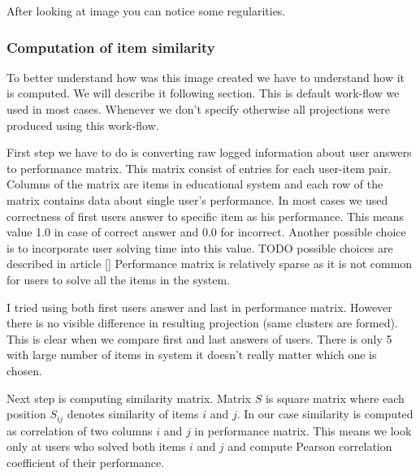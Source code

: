 \documentclass[
  digital, %
  table,   %
  nolof,     %
  nolot,     %
  nocover
]{fithesis3}
\begin{document}


After looking at image you can notice some regularities.

\subsubsection{Computation of item
similarity}\label{computation-of-item-similarity}


To better understand how was this image created we have to understand
how it is computed. We will describe it following section. This is
default work-flow we used in most cases. Whenever we don't specify
otherwise all projections were produced using this work-flow.


First step we have to do is converting raw logged information about
user answers to performance matrix. This matrix consist of entries for
each user-item pair. Columns of the matrix are items in educational
system and each row of the matrix contains data about single user's
performance. In most cases we used correctness of first users answer
to specific item as his performance. This means value 1.0 in case of
correct answer and 0.0 for incorrect. Another possible choice is to
incorporate user solving time into this value. TODO possible choices
are described in article {[}{]} Performance matrix is relatively
sparse as it is not common for users to solve all the items in the
system.

I tried using both first users answer and last in performance matrix.
However there is no visible difference in resulting projection (same
clusters are formed). This is clear when we compare first and last
answers of users. There is only 5%
with large number of items in system it doesn't really matter which one
is chosen.


Next step is computing similarity matrix. Matrix $S$ is square
matrix where each position $S_{ij}$ denotes similarity of items
$i$ and $j$. In our case similarity is computed as correlation of
two columns $i$ and $j$ in performance matrix. This means we look
only at users who solved both items $i$ and $j$ and compute
Pearson correlation coefficient of their performance.
\end{document}
